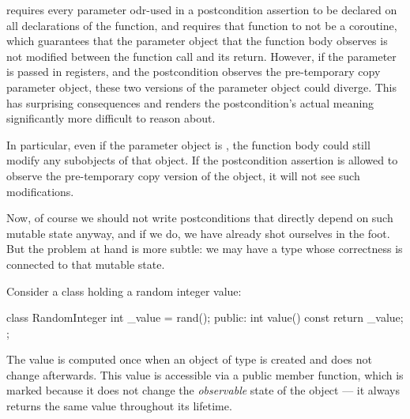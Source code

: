 \cite{P2900R10} requires every parameter odr-used in a postcondition assertion  to be declared  on all declarations of the function, and requires that function to not be a coroutine, which guarantees that the parameter object that the function body observes is not modified between the function call and its return. However, if the parameter is passed in registers, and the postcondition observes the pre-temporary copy parameter object, these two versions of the parameter object could diverge. This has surprising consequences and renders the postcondition's actual meaning significantly more difficult to reason about. 

In particular, even if the parameter object is , the function body could still modify any  subobjects of that object. If the postcondition assertion is allowed to observe the pre-temporary copy version of the object, it will not see such modifications.

Now, of course we should not write postconditions that directly depend on such mutable state anyway, and if we do, we have already shot ourselves in the foot. But the problem at hand is more subtle: we may have a type whose correctness is connected to that mutable state.

Consider a class  holding a random integer value:

\begin{codeblock}
class RandomInteger {
  int _value = rand();
public:
  int value() const { 
    return _value; 
  }
};
\end{codeblock}

The value is computed once when an object of type  is created and does not change afterwards. This value is accessible via a public  member function, which is marked  because it does not change the \emph{observable} state of the object --- it always returns the same value throughout its lifetime.

